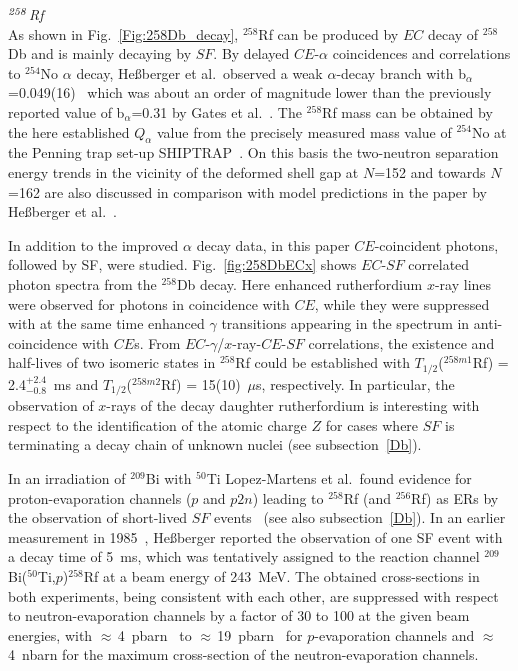 {\it $^{\it258}$Rf}\\    
As shown in Fig.~\ref{Fig:258Db_decay}, $^{258}$Rf can be produced by $EC$ decay of $^{258}$Db and is mainly decaying by $SF$. 
By delayed $CE$-$\alpha$ coincidences and correlations to $^{254}$No $\alpha$ decay, He{\ss}berger et al.~observed a weak $\alpha$-decay branch with b$_\alpha$=0.049(16)~\cite{Hessberger2016a} which was about an order of magnitude lower than the previously reported value of b$_\alpha$=0.31 by Gates et al.~\cite{Gates2008}. 
The $^{258}$Rf mass can be obtained by the here established $Q_\alpha$ value from the precisely measured mass value of $^{254}$No at the Penning trap set-up SHIPTRAP~\cite{Block2010}. On this basis the two-neutron separation energy trends in the vicinity of the deformed shell gap at $N$=152 and towards $N$=162 are also discussed in comparison with model predictions in the paper by He{\ss}berger et al.~\cite{Hessberger2016a}. 

In addition to the improved $\alpha$ decay data, in this paper $CE$-coincident photons, followed by SF, were studied. Fig.~\ref{fig:258DbECx} shows $EC$-$SF$ correlated photon spectra from the $^{258}$Db decay. Here enhanced rutherfordium $x$-ray lines were observed for photons in coincidence with $CE$, while they were suppressed with at the same time enhanced $\gamma$ transitions appearing in the spectrum in anti-coincidence with $CE$s. 
From $EC$-$\gamma$/$x$-ray-$CE$-$SF$ correlations, the existence and half-lives of two isomeric states in $^{258}$Rf could be established with $T_{1/2}$($^{258m1}$Rf) = 2.4$^{+2.4}_{-0.8}$~ms and  $T_{1/2}$($^{258m2}$Rf) = 15(10)~$\mu$s, respectively.
In particular, the observation of $x$-rays of the decay daughter rutherfordium is interesting with respect to the identification of the atomic charge $Z$ for cases where $SF$ is terminating a decay chain of unknown nuclei (see subsection~\ref{Db}).
 
In an irradiation of $^{209}$Bi with $^{50}$Ti Lopez-Martens et al.~found evidence for proton-evaporation channels ($p$ and $p2n$) leading to $^{258}$Rf (and $^{256}$Rf) as ERs by the observation of short-lived $SF$ events~\cite{Lopez-Martens2019} (see also subsection~\ref{Db}). 
In an earlier measurement in 1985~\cite{Hessberger1985}, He{\ss}berger reported the observation of one SF event with a decay time of 5~ms, which was tentatively assigned to the reaction channel $^{209}$Bi($^{50}$Ti,$p$)$^{258}$Rf at a beam energy of 243~MeV. 
The obtained cross-sections in both experiments, being consistent with each other, are suppressed with respect to neutron-evaporation channels by a factor of 30 to 100 at the given beam energies, with $\approx$\,4~pbarn~\cite{Lopez-Martens2019} to  $\approx$\,19~pbarn~\cite{Hessberger1985,Hessberger2019} for $p$-evaporation channels  and $\approx$\,4~nbarn for the maximum cross-section of the neutron-evaporation channels. 

